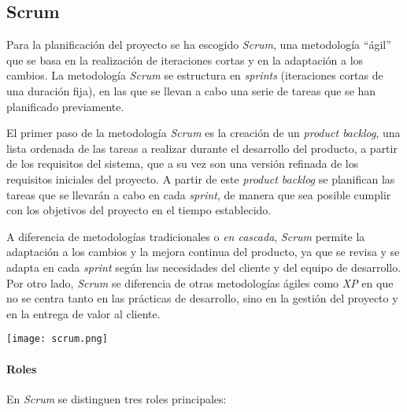 \newpage{}
\subsection{Scrum}\label{subsec:scrum}
Para la planificación del proyecto se ha escogido \textit{Scrum}, una
metodología ``ágil'' que se basa en la realización de iteraciones cortas y en la
adaptación a los cambios. La metodología \textit{Scrum} se estructura en
\textit{sprints} (iteraciones cortas de una duración fija), en las que se llevan
a cabo una serie de tareas que se han planificado previamente.

El primer paso de la metodología \textit{Scrum} es la creación de un
\textit{product backlog}, una lista ordenada de las tareas a realizar durante el
desarrollo del producto, a partir de los requisitos del sistema, que a su vez
son una versión refinada de los requisitos iniciales del proyecto. A partir de
este \textit{product backlog} se planifican las tareas que se llevarán a cabo en
cada \textit{sprint}, de manera que sea posible cumplir con los objetivos del
proyecto en el tiempo establecido.

A diferencia de metodologías tradicionales o \emph{en cascada}, \textit{Scrum}
permite la adaptación a los cambios y la mejora continua del producto, ya que se
revisa y se adapta en cada \textit{sprint} según las necesidades del cliente y
del equipo de desarrollo. Por otro lado, \textit{Scrum} se diferencia de otras
metodologías ágiles como \textit{XP} en que no se centra tanto en las prácticas
de desarrollo, sino en la gestión del proyecto y en la entrega de valor al
cliente.

\begin{minipage}{\linewidth}
	\texttt{[image: scrum.png]}
\end{minipage}

\paragraph{Roles}
En \textit{Scrum} se distinguen tres roles principales:

